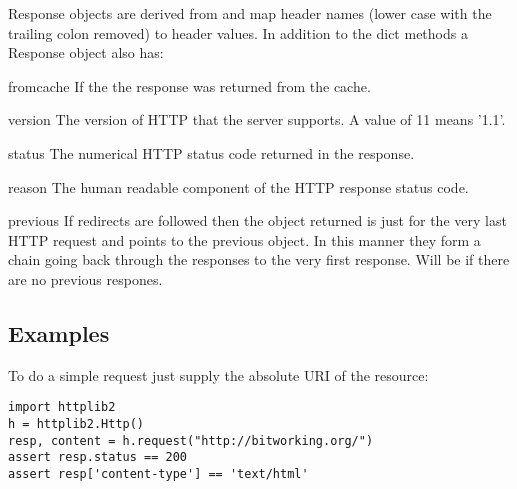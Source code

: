 Response objects are derived from  and map
header names (lower case with the trailing colon removed)
to header values. In addition to the dict methods
a Response object also has:

\begin{memberdesc}[Response]{fromcache}
If  the the response was returned from the cache.
\end{memberdesc}

\begin{memberdesc}[Response]{version}
The version of HTTP that the server supports. A value
of 11 means '1.1'.
\end{memberdesc}

\begin{memberdesc}[Response]{status}
The numerical HTTP status code returned in the response.
\end{memberdesc}

\begin{memberdesc}[Response]{reason}
The human readable component of the HTTP response status code.
\end{memberdesc}

\begin{memberdesc}[Response]{previous}
If redirects are followed then the  object returned
is just for the very last HTTP request and  points to
the previous  object. In this manner they form a chain
going back through the responses to the very first response.
Will be  if there are no previous respones.
\end{memberdesc}







\subsection{Examples \label{httplib2-example}}

To do a simple  request just supply the absolute URI
of the resource:

\begin{verbatim}
import httplib2
h = httplib2.Http()
resp, content = h.request("http://bitworking.org/")
assert resp.status == 200
assert resp['content-type'] == 'text/html'
\end{verbatim}

